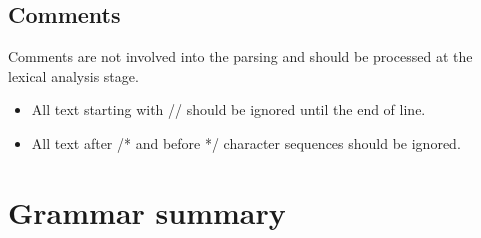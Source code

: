 \documentclass{article}
\begin{document}
		\subsection{Comments}
			Comments are not involved into the parsing and should be processed at the
			lexical analysis stage.
		
			\begin{itemize}
				\item All text starting with // should be ignored until the end of line.
				
				\item All text after /*  and before */ character sequences should be
				ignored.
			\end{itemize}

	\section{Grammar summary}
		\itshape
		\setlength{\grammarindent}{12em}
\end{document}
